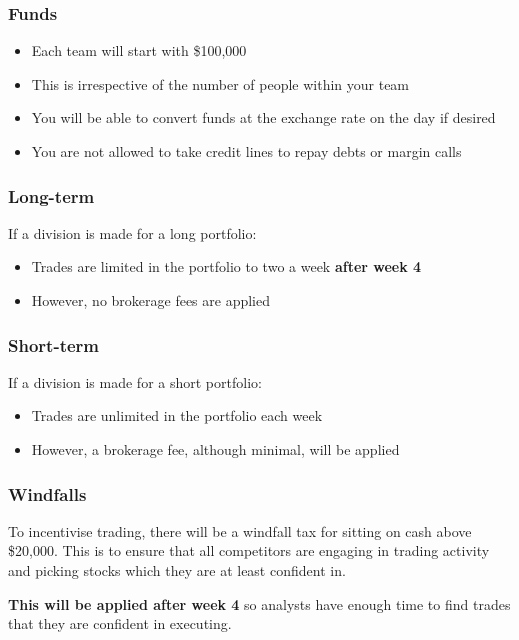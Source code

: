 \documentclass[a4paper]{article}
\begin{document}
{\subsubsection{Funds}
\begin{itemize}
	\item Each team will start with \$100,000
	\item This is irrespective of the number of people within your team
	\item You will be able to convert funds at the exchange rate on the day if desired
	\item You are not allowed to take credit lines to repay debts or margin calls
\end{itemize}

\subsubsection{Long-term}
If a division is made for a long portfolio:
\begin{itemize}
	\item Trades are limited in the portfolio to two a week \textbf{after week 4}
	\item However, no brokerage fees are applied
\end{itemize}

\subsubsection{Short-term}
If a division is made for a short portfolio:
\begin{itemize}
	\item Trades are unlimited in the portfolio each week
	\item However, a brokerage fee, although minimal, will be applied
\end{itemize}

\subsubsection{Windfalls}
To incentivise trading, there will be a windfall tax for sitting on cash above \$20,000. This is to ensure that all competitors are engaging in trading activity and picking stocks which they are at least confident in.

\vspace{10pt}
\noindent \textbf{This will be applied after week 4} so analysts have enough time to find trades that they are confident in executing.

}
\end{document}
